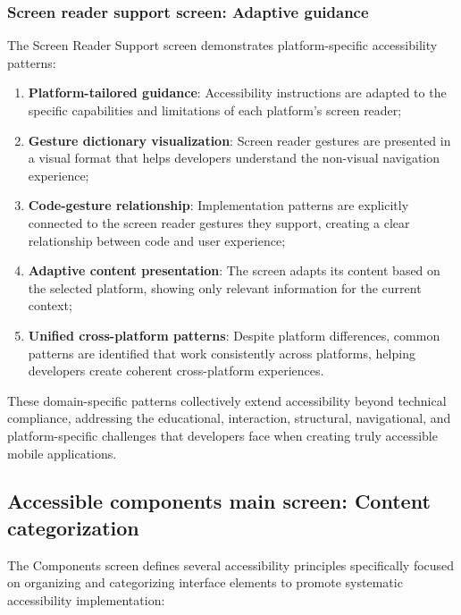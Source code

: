 \subsubsection{Screen reader support screen: Adaptive guidance}

The Screen Reader Support screen demonstrates platform-specific accessibility patterns:

\begin{enumerate}
    \item \textbf{Platform-tailored guidance}: Accessibility instructions are adapted to the specific capabilities and limitations of each platform's screen reader;
    
    \item \textbf{Gesture dictionary visualization}: Screen reader gestures are presented in a visual format that helps developers understand the non-visual navigation experience;
    
    \item \textbf{Code-gesture relationship}: Implementation patterns are explicitly connected to the screen reader gestures they support, creating a clear relationship between code and user experience;
    
    \item \textbf{Adaptive content presentation}: The screen adapts its content based on the selected platform, showing only relevant information for the current context;
    
    \item \textbf{Unified cross-platform patterns}: Despite platform differences, common patterns are identified that work consistently across platforms, helping developers create coherent cross-platform experiences.
\end{enumerate}

These domain-specific patterns collectively extend accessibility beyond technical compliance, addressing the educational, interaction, structural, navigational, and platform-specific challenges that developers face when creating truly accessible mobile applications.

\subsection{Accessible components main screen: Content categorization}

The Components screen defines several accessibility principles specifically focused on organizing and categorizing interface elements to promote systematic accessibility implementation:

